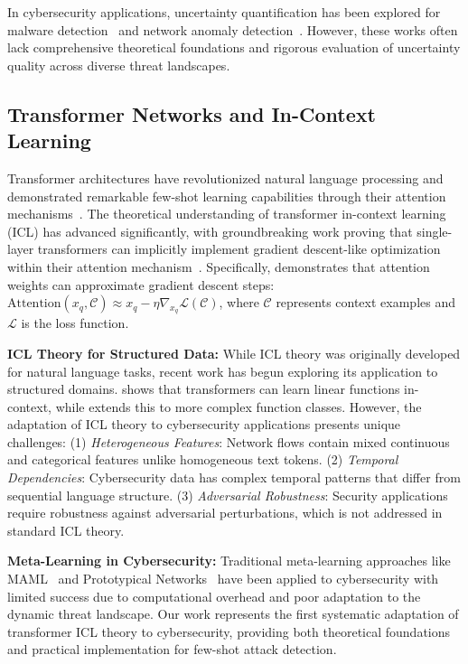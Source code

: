 \documentclass[journal]{IEEEtran}
\begin{document}
In cybersecurity applications, uncertainty quantification has been explored for malware detection~\cite{grosse2017statistical} and network anomaly detection~\cite{wang2019uncertainty}. However, these works often lack comprehensive theoretical foundations and rigorous evaluation of uncertainty quality across diverse threat landscapes.

\subsection{Transformer Networks and In-Context Learning}

Transformer architectures have revolutionized natural language processing and demonstrated remarkable few-shot learning capabilities through their attention mechanisms~\cite{vaswani2017attention}. The theoretical understanding of transformer in-context learning (ICL) has advanced significantly, with groundbreaking work proving that single-layer transformers can implicitly implement gradient descent-like optimization within their attention mechanism~\cite{von2023transformers, akyurek2022learning}. Specifically, \cite{akyurek2022learning} demonstrates that attention weights can approximate gradient descent steps: $\text{Attention}(x_q, \mathcal{C}) \approx x_q - \eta \nabla_{x_q} \mathcal{L}(\mathcal{C})$, where $\mathcal{C}$ represents context examples and $\mathcal{L}$ is the loss function.

\textbf{ICL Theory for Structured Data:} While ICL theory was originally developed for natural language tasks, recent work has begun exploring its application to structured domains. \cite{garg2022can} shows that transformers can learn linear functions in-context, while \cite{dai2022can} extends this to more complex function classes. However, the adaptation of ICL theory to cybersecurity applications presents unique challenges: (1) \textit{Heterogeneous Features}: Network flows contain mixed continuous and categorical features unlike homogeneous text tokens. (2) \textit{Temporal Dependencies}: Cybersecurity data has complex temporal patterns that differ from sequential language structure. (3) \textit{Adversarial Robustness}: Security applications require robustness against adversarial perturbations, which is not addressed in standard ICL theory.

\textbf{Meta-Learning in Cybersecurity:} Traditional meta-learning approaches like MAML~\cite{finn2017model} and Prototypical Networks~\cite{snell2017prototypical} have been applied to cybersecurity with limited success due to computational overhead and poor adaptation to the dynamic threat landscape. Our work represents the first systematic adaptation of transformer ICL theory to cybersecurity, providing both theoretical foundations and practical implementation for few-shot attack detection.
\end{document}
